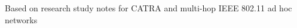 \begin{frame}[plain]
    \vfill

    \begin{minipage}{0.66\paperwidth}
        \raggedright
        \fontsize{19}{24}\selectfont\bfseries\color{TitleColor}\inserttitle
    \end{minipage}

    \vspace{0.35cm}

    \begin{minipage}{0.82\paperwidth}
        \raggedright
        \fontsize{15}{20}\selectfont\color{SecondaryColor}\insertsubtitle
    \end{minipage}

    \vspace{0.95cm}

    {\fontsize{12}{15}\selectfont\bfseries\insertauthor}

    \vspace{0.20cm}

    {\fontsize{9}{12}\selectfont\color{SecondaryColor}\insertinstitute}

    \vspace{0.60cm}

    {\fontsize{9}{11}\selectfont\color{SecondaryColor}
    Based on research study notes for CATRA and multi-hop IEEE 802.11 ad hoc networks}

    \vfill
\end{frame}
